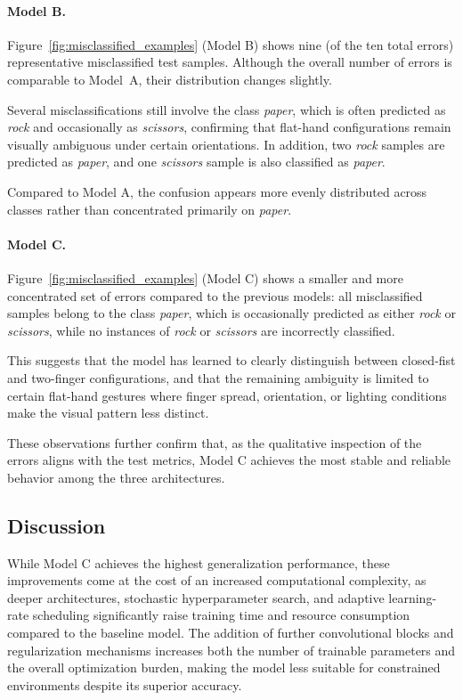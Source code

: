 \documentclass[11pt,a4paper]{article}
\begin{document}
\paragraph{Model B.}

Figure~\ref{fig:misclassified_examples} (Model B) shows nine (of the ten total errors) representative misclassified test samples. 
Although the overall number of errors is comparable to Model~A, their distribution changes slightly.

Several misclassifications still involve the class \textit{paper}, which is often predicted as \textit{rock} and occasionally as \textit{scissors}, confirming that flat-hand configurations remain visually ambiguous under certain orientations. 
In addition, two \textit{rock} samples are predicted as \textit{paper}, and one \textit{scissors} sample is also classified as \textit{paper}. 

Compared to Model A, the confusion appears more evenly distributed across classes rather than concentrated primarily on \textit{paper}. 

\paragraph{Model C.}

Figure~\ref{fig:misclassified_examples} (Model C) shows a smaller and more concentrated set of errors compared to the previous models: all misclassified samples belong to the class \textit{paper}, which is occasionally predicted as either \textit{rock} or \textit{scissors}, while no instances of \textit{rock} or \textit{scissors} are incorrectly classified. 

This suggests that the model has learned to clearly distinguish between closed-fist and two-finger configurations, and that the remaining ambiguity is limited to certain flat-hand gestures where finger spread, orientation, or lighting conditions make the visual pattern less distinct. 

These observations further confirm that, as the qualitative inspection of the errors aligns with the test metrics, Model C achieves the most stable and reliable behavior among the three architectures.


\subsection{Discussion}
While Model C achieves the highest generalization performance, these improvements come at the cost of an increased computational complexity, as deeper architectures, stochastic hyperparameter search, and adaptive learning-rate scheduling significantly raise training time and resource consumption compared to the baseline model. The addition of further convolutional blocks and regularization mechanisms increases both the number of trainable parameters and the overall optimization burden, making the model less suitable for constrained environments despite its superior accuracy.
\end{document}
